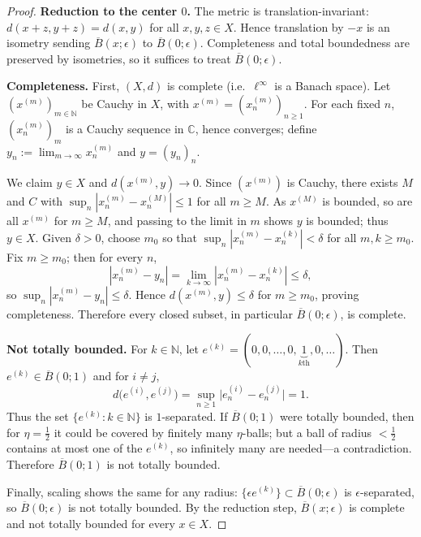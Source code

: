 \documentclass[12pt, a4paper]{report}
\theoremstyle{spaced}
\begin{document}
\begin{proof}
	\textbf{Reduction to the center $0$.}
	The metric is translation-invariant: $d(x+z,y+z)=d(x,y)$ for all $x,y,z\in X$.
	Hence translation by $-x$ is an isometry sending $\overline{B}(x;\epsilon)$ to
	$\overline{B}(0;\epsilon)$. Completeness and total boundedness are preserved by
	isometries, so it suffices to treat $\overline{B}(0;\epsilon)$.

	\medskip
	\textbf{Completeness.}
	First, $(X,d)$ is complete (i.e.\ $\ell^\infty$ is a Banach space). Let $(x^{(m)})_{m\in\mathbb{N}}$
	be Cauchy in $X$, with $x^{(m)}=(x^{(m)}_n)_{n\ge1}$. For each fixed $n$, $(x^{(m)}_n)_m$ is a Cauchy
	sequence in $\mathbb{C}$, hence converges; define $y_n:=\lim_{m\to\infty}x^{(m)}_n$ and $y=(y_n)_n$.

	We claim $y\in X$ and $d(x^{(m)},y)\to0$. Since $(x^{(m)})$ is Cauchy, there exists $M$ and $C$ with
	$\sup_n|x^{(m)}_n-x^{(M)}_n|\le 1$ for all $m\ge M$. As $x^{(M)}$ is bounded, so are all $x^{(m)}$ for $m\ge M$,
	and passing to the limit in $m$ shows $y$ is bounded; thus $y\in X$.
	Given $\delta>0$, choose $m_0$ so that $\sup_n|x^{(m)}_n-x^{(k)}_n|<\delta$ for all $m,k\ge m_0$.
	Fix $m\ge m_0$; then for every $n$,
	\[
		|x^{(m)}_n-y_n|=\lim_{k\to\infty}|x^{(m)}_n-x^{(k)}_n|\le \delta,
	\]
	so $\sup_n|x^{(m)}_n-y_n|\le\delta$. Hence $d(x^{(m)},y)\le\delta$ for $m\ge m_0$, proving completeness.
	Therefore every closed subset, in particular $\overline{B}(0;\epsilon)$, is complete.

	\medskip
	\textbf{Not totally bounded.}
	For $k\in\mathbb{N}$, let $e^{(k)}=(0,0,\dots,0,\underbrace{1}_{k\text{th}},0,\dots)$.
	Then $e^{(k)}\in \overline{B}(0;1)$ and for $i\ne j$,
	\[
		d\bigl(e^{(i)},e^{(j)}\bigr)=\sup_{n\ge1}\bigl|e^{(i)}_n-e^{(j)}_n\bigr|=1.
	\]
	Thus the set $\{e^{(k)}:k\in\mathbb{N}\}$ is $1$-separated. If $\overline{B}(0;1)$ were totally bounded,
	then for $\eta=\tfrac12$ it could be covered by finitely many $\eta$-balls; but a ball of radius $<\tfrac12$
	contains at most one of the $e^{(k)}$, so infinitely many are needed—a contradiction. Therefore
	$\overline{B}(0;1)$ is not totally bounded.

	Finally, scaling shows the same for any radius: $\{\epsilon e^{(k)}\}\subset \overline{B}(0;\epsilon)$ is
	$\epsilon$-separated, so $\overline{B}(0;\epsilon)$ is not totally bounded. By the reduction step,
	$\overline{B}(x;\epsilon)$ is complete and not totally bounded for every $x\in X$.
\end{proof}
\end{document}
